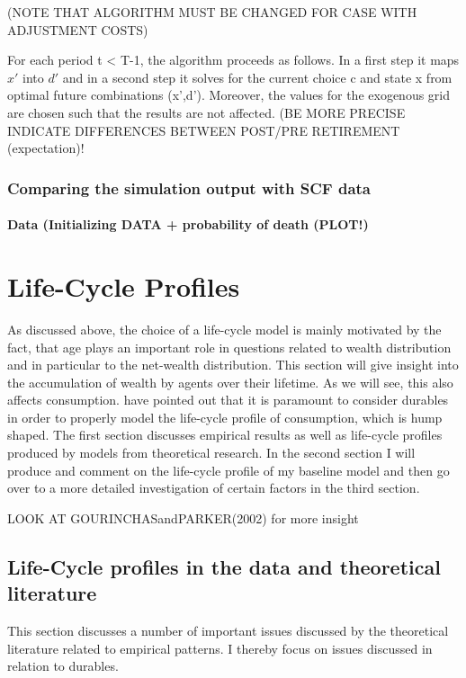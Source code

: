 \documentclass[a4paper,12pt]{article}
\begin{document}
(NOTE THAT ALGORITHM MUST BE CHANGED FOR CASE WITH ADJUSTMENT COSTS)

For each period t < T-1, the algorithm proceeds as follows. In a first step it maps $x'$ into $d'$ and in a second step it solves for the current choice c and state x from optimal future combinations (x',d'). Moreover, the values for the exogenous grid are chosen such that the results are not affected. (BE MORE PRECISE
INDICATE DIFFERENCES BETWEEN POST/PRE RETIREMENT (expectation)!

\subsubsection{Comparing the simulation output with SCF data}

\paragraph{Data (Initializing DATA + probability of death (PLOT!)}



\section{Life-Cycle Profiles}
As discussed above, the choice of a life-cycle model is mainly motivated by the fact, that age plays an important role in questions related to wealth distribution and in particular to the net-wealth distribution. This section will give insight into the accumulation of wealth by agents over their lifetime. As we will see, this also affects consumption. \cite{FV&K2011} have pointed out that it is paramount to consider durables in order to properly model the life-cycle profile of consumption, which is hump shaped. The first section discusses empirical results as well as life-cycle profiles produced by models from theoretical research. In the second section I will produce and comment on the life-cycle profile of my baseline model and then go over to a more detailed investigation of certain factors in the third section. 

LOOK AT GOURINCHASandPARKER(2002) for more insight

\subsection{Life-Cycle profiles in the data and theoretical literature}

This section discusses a number of important issues discussed by the theoretical literature related to empirical patterns. I thereby focus on issues discussed in relation to durables. 
\end{document}
